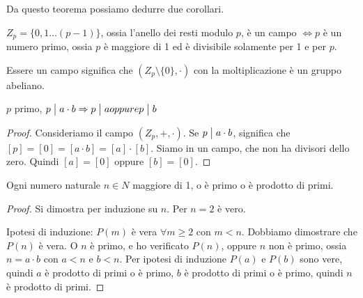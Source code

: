 Da questo teorema possiamo dedurre due corollari.

\begin{cor}\label{corollario_interi_primo}
$Z_p = \{ 0, 1 \dots (p-1) \}$, ossia l'anello dei resti modulo $p$, \`e un campo $\Leftrightarrow p$ \`e un numero primo, ossia $p$ \`e maggiore di 1 ed \`e divisibile solamente per 1 e per $p$.

Essere un campo significa che $(Z_p \setminus \{ 0 \}, \cdot)$ con la moltiplicazione \`e un gruppo abeliano.
\end{cor}

\begin{cor}\label{corollario_interi_secondo}
$p$ primo, $p \bigm| a \cdot b \Rightarrow p \bigm| a oppure p \bigm| b$
\end{cor}
\begin{proof}
Consideriamo il campo $(Z_p, +, \cdot)$. Se $p \bigm| a \cdot b$, significa che $[p] = [0] = [a \cdot b] = [a] \cdot [b]$. Siamo in un campo, che non ha divisori dello zero. Quindi $[a] = [0]$ oppure $[b] = [0]$.
\end{proof}

\begin{prop}
Ogni numero naturale $n \in N$ maggiore di 1, o \`e primo o \`e prodotto di primi.
\end{prop}
\begin{proof}
Si dimostra per induzione su $n$. Per $n = 2$ \`e vero.

Ipotesi di induzione: $P(m)$ \`e vera $\forall m \ge 2$ con $m < n$. Dobbiamo dimostrare che $P(n)$ \`e vera. O $n$ \`e primo, e ho verificato $P(n)$, oppure $n$ non \`e primo, ossia $n = a \cdot b$ con $a < n$ e $b < n$. Per ipotesi di induzione $P(a)$ e $P(b)$ sono vere, quindi $a$ \`e prodotto di primi o \`e primo, $b$ \`e prodotto di primi o \`e primo, quindi $n$ \`e prodotto di primi.
\end{proof}


